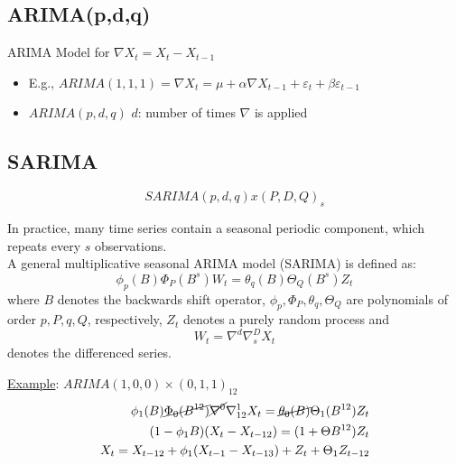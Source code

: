 \subsection{ARIMA(p,d,q)}

ARIMA Model for \(\nabla X_t=X_t-X_{t-1}\)
\begin{itemize}
    \item[] E.g., \( ARIMA(1,1,1)=\nabla X_t=\mu +\alpha \nabla X_{t-1} + \varepsilon_t + \beta \varepsilon_{t-1} \)
    \item $ARIMA(p,d,q)$ \quad $d$: number of times $\nabla$ is applied
\end{itemize}

\subsection{SARIMA}

\[SARIMA(p,d,q) x (P,D,Q)_s\]

In practice, many time series contain a seasonal periodic component, which repeats every $s$ observations. \\

A general multiplicative seasonal ARIMA model (SARIMA) is defined as: \[
\phi_p(B) \Phi_P(B^s)W_t = \theta_q(B)\Theta_Q(B^s)Z_t 
\]
\quad where $B$ denotes the backwards shift operator, $\phi_p, \Phi_P, \theta_q, \Theta_Q$ are polynomials of order $p,P,q,Q$, respectively, $Z_t$ denotes a purely random process and \[ W_t=\nabla^d \nabla^D_s X_t \] denotes the differenced series.

\underline{Example}: $ARIMA(1,0,0)\times(0,1,1)_12$
\begin{align*}
    \phi_1(B) \cancel{\Phi_0(B^{12})} \cancel{\nabla^0} \nabla^1_{12} X_t = \cancel{\theta_0(B)}\Theta_1(B^{12})Z_t \\
    (1-\phi_1 B)(X_t-X_{t-12})=(1+\Theta B^{12})Z_t \\
    X_t = X_{t-12} + \phi_1(X_{t-1}-X_{t-13}) + Z_t + \Theta_1 Z_{t-12}
\end{align*}

